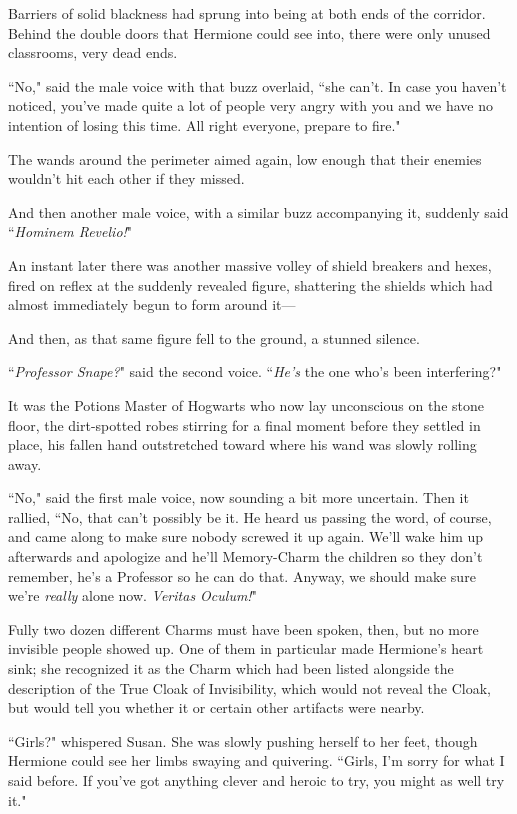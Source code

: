 Barriers of solid blackness had sprung into being at both ends of the corridor. Behind the double doors that Hermione could see into, there were only unused classrooms, very dead ends.

``No," said the male voice with that buzz overlaid, ``she can't. In case you haven't noticed, you've made quite a lot of people very angry with you and we have no intention of losing this time. All right everyone, prepare to fire."

The wands around the perimeter aimed again, low enough that their enemies wouldn't hit each other if they missed.

And then another male voice, with a similar buzz accompanying it, suddenly said ``\emph{Hominem Revelio!}"

An instant later there was another massive volley of shield breakers and hexes, fired on reflex at the suddenly revealed figure, shattering the shields which had almost immediately begun to form around it—

And then, as that same figure fell to the ground, a stunned silence.

``\emph{Professor Snape?}" said the second voice. ``\emph{He's} the one who's been interfering?"

It was the Potions Master of Hogwarts who now lay unconscious on the stone floor, the dirt-spotted robes stirring for a final moment before they settled in place, his fallen hand outstretched toward where his wand was slowly rolling away.

``No," said the first male voice, now sounding a bit more uncertain. Then it rallied, ``No, that can't possibly be it. He heard us passing the word, of course, and came along to make sure nobody screwed it up again. We'll wake him up afterwards and apologize and he'll Memory-Charm the children so they don't remember, he's a Professor so he can do that. Anyway, we should make sure we're \emph{really} alone now. \emph{Veritas Oculum!}"

Fully two dozen different Charms must have been spoken, then, but no more invisible people showed up. One of them in particular made Hermione's heart sink; she recognized it as the Charm which had been listed alongside the description of the True Cloak of Invisibility, which would not reveal the Cloak, but would tell you whether it or certain other artifacts were nearby.

``Girls?" whispered Susan. She was slowly pushing herself to her feet, though Hermione could see her limbs swaying and quivering. ``Girls, I'm sorry for what I said before. If you've got anything clever and heroic to try, you might as well try it."

